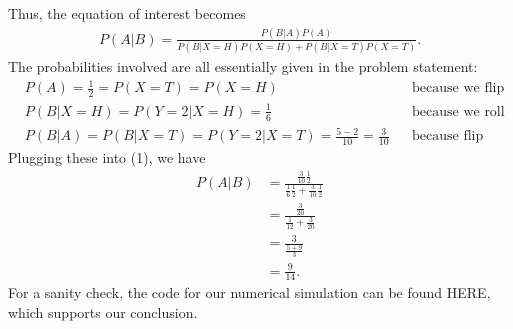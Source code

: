 \documentclass[10pt,a4paper]{article}
\theoremstyle{theorem}
\theoremstyle{definition}
\begin{document}
Thus, the equation of interest becomes
\begin{align}
P(A|B) = \frac{P(B|A) P(A)}{P(B| X = H) P(X = H) + P(B| X = T) P(X = T)}.
\end{align}
The probabilities involved are all essentially given in the problem statement:
\begin{align*}
&P(A) = \frac{1}{2} = P(X = T) = P(X = H) && \text{because we flip a fair coin}\\
&P(B|X = H) = P(Y = 2| X = H) = \frac{1}{6} && \text{because we roll a fair die}\\
&P(B|A) = P(B|X = T) = P(Y = 2| X = T) = \frac{5 - 2}{10} = \frac{3}{10} && \text{because flip our weighted die}
\end{align*}
Plugging these into (1), we have
\begin{align*}
P(A|B) &= \frac{\frac{3}{10} \frac{1}{2}}{\frac{1}{6}  \frac{1}{2} + \frac{3}{10} \frac{1}{2}}\\
&= \frac{\frac{3}{20}}{\frac{1}{12} + \frac{3}{20}}\\
&= \frac{3}{\frac{5 + 9}{3}}\\
&= \frac{9}{14}.
\end{align*}
For a sanity check, the code for our numerical simulation can be found HERE, which supports our conclusion.
\end{document}
